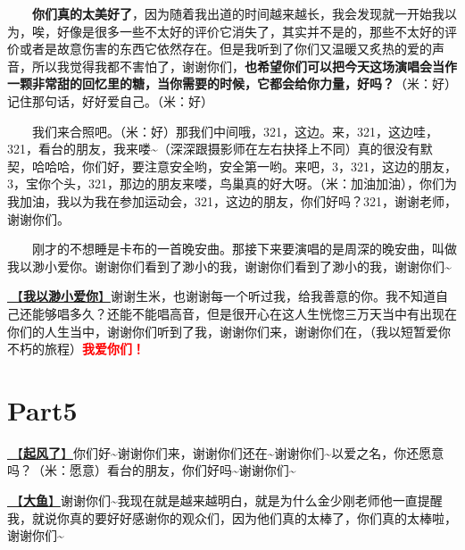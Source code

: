 \documentclass[]{ctexbook}
\begin{document}
  \textbf{你们真的太美好了}，因为随着我出道的时间越来越长，我会发现就一开始我以为，唉，好像是很多一些不太好的评价它消失了，其实并不是的，那些不太好的评价或者是故意伤害的东西它依然存在。但是我听到了你们又温暖又炙热的爱的声音，所以我觉得我都不害怕了，谢谢你们，\textbf{也希望你们可以把今天这场演唱会当作一颗非常甜的回忆里的糖，当你需要的时候，它都会给你力量，好吗？}（米：好）记住那句话，好好爱自己。（米：好）

  我们来合照吧。（米：好）那我们中间哦，321，这边。来，321，这边哇，321，看台的朋友，我来喽\textasciitilde（深深跟摄影师在左右抉择上不同）真的很没有默契，哈哈哈，你们好，要注意安全哟，安全第一哟。来吧，3，321，这边的朋友，3，宝你个头，321，那边的朋友来喽，鸟巢真的好大呀。（米：加油加油），你们为我加油，我以为我在参加运动会，321，这边的朋友，你们好吗？321，谢谢老师，谢谢你们。

  刚才的不想睡是卡布的一首晚安曲。那接下来要演唱的是周深的晚安曲，叫做我以渺小爱你。谢谢你们看到了渺小的我，谢谢你们看到了渺小的我，谢谢你们\textasciitilde{}

\hyperref[loving-you-in-my-humble-way]{🎵【\textbf{我以渺小爱你}】}谢谢生米，也谢谢每一个听过我，给我善意的你。我不知道自己还能够唱多久？还能不能唱高音，但是很开心在这人生恍惚三万天当中有出现在你们的人生当中，谢谢你们听到了我，谢谢你们来，谢谢你们在，（我以短暂爱你不朽的旅程）\textbf{\textcolor{red}{我爱你们！}}

\section{Part5}\label{beijing-20240921-part5}

\hyperref[the-wind-rises]{🎵【\textbf{起风了}】}你们好\textasciitilde 谢谢你们来，谢谢你们还在\textasciitilde 谢谢你们\textasciitilde 以爱之名，你还愿意吗？（米：愿意）看台的朋友，你们好吗\textasciitilde 谢谢你们\textasciitilde{}

\hyperref[big-fish]{🎵【\textbf{大鱼}】}谢谢你们\textasciitilde 我现在就是越来越明白，就是为什么金少刚老师他一直提醒我，就说你真的要好好感谢你的观众们，因为他们真的太棒了，你们真的太棒啦，谢谢你们\textasciitilde{}
\end{document}
